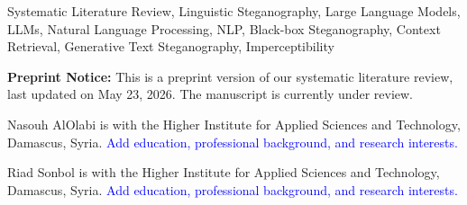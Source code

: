 \documentclass{ieeeaccess}
\newcommand{\todo}[1]{\textcolor{blue}{#1}}
\begin{document}
\begin{keywords}
	Systematic Literature Review, Linguistic Steganography, Large Language Models, LLMs, Natural Language Processing, NLP, Black-box Steganography, Context Retrieval, Generative Text Steganography, Imperceptibility
\end{keywords}

\titlepgskip=-21pt
\maketitle

\noindent\textbf{Preprint Notice:} This is a preprint version of our systematic literature review, last updated on May 23, 2026. The manuscript is currently under review.













\clearpage
\onecolumn
\begin{landscape}
	
\end{landscape}
\clearpage

\begin{IEEEbiographynophoto}{Nasouh AlOlabi}
is with the Higher Institute for Applied Sciences and Technology, Damascus,
Syria. \todo{Add education, professional background, and research interests.}
\end{IEEEbiographynophoto}

\begin{IEEEbiographynophoto}{Riad Sonbol}
is with the Higher Institute for Applied Sciences and Technology, Damascus,
Syria. \todo{Add education, professional background, and research interests.}
\end{IEEEbiographynophoto}

\EOD

%
\end{document}
